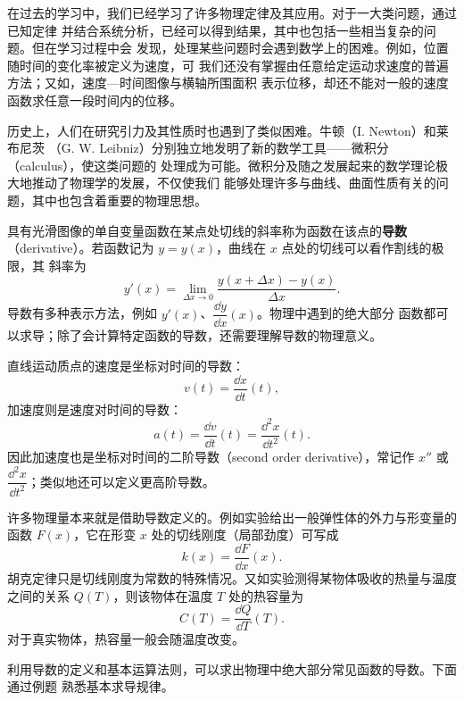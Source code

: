 在过去的学习中，我们已经学习了许多物理定律及其应用。对于一大类问题，通过已知定律
并结合系统分析，已经可以得到结果，其中也包括一些相当复杂的问题。但在学习过程中会
发现，处理某些问题时会遇到数学上的困难。例如，位置随时间的变化率被定义为速度，可
我们还没有掌握由任意给定运动求速度的普遍方法；又如，速度—时间图像与横轴所围面积
表示位移，却还不能对一般的速度函数求任意一段时间内的位移。

历史上，人们在研究引力及其性质时也遇到了类似困难。牛顿（I. Newton）和莱布尼茨
（G. W. Leibniz）分别独立地发明了新的数学工具——微积分（calculus），使这类问题的
处理成为可能。微积分及随之发展起来的数学理论极大地推动了物理学的发展，不仅使我们
能够处理许多与曲线、曲面性质有关的问题，其中也包含着重要的物理思想。

具有光滑图像的单自变量函数在某点处切线的斜率称为函数在该点的\textbf{导数}
（derivative）。若函数记为 $y=y(x)$，曲线在 $x$ 点处的切线可以看作割线的极限，其
斜率为
\begin{equation}
 y'(x)=\lim_{\Delta x\to0}\frac{y(x+\Delta x)-y(x)}{\Delta x}.
\end{equation}
导数有多种表示方法，例如 $y'(x)$、$\dfrac{\dd y}{\dd x}(x)$。物理中遇到的绝大部分
函数都可以求导；除了会计算特定函数的导数，还需要理解导数的物理意义。

直线运动质点的速度是坐标对时间的导数：
\begin{equation}
 v(t)=\frac{\dd x}{\dd t}(t),
\end{equation}
加速度则是速度对时间的导数：
\begin{equation}
 a(t)=\frac{\dd v}{\dd t}(t)=\frac{\dd^2x}{\dd t^2}(t).
\end{equation}
因此加速度也是坐标对时间的二阶导数（second order derivative），常记作 $x''$ 或
$\dfrac{\dd^2x}{\dd t^2}$；类似地还可以定义更高阶导数。

许多物理量本来就是借助导数定义的。例如实验给出一般弹性体的外力与形变量的函数
$F(x)$，它在形变 $x$ 处的切线刚度（局部劲度）可写成
\begin{equation}
 k(x)=\frac{\dd F}{\dd x}(x).
\end{equation}
胡克定律只是切线刚度为常数的特殊情况。又如实验测得某物体吸收的热量与温度之间的关系
$Q(T)$，则该物体在温度 $T$ 处的热容量为
\begin{equation}
 C(T)=\frac{\dd Q}{\dd T}(T).
\end{equation}
对于真实物体，热容量一般会随温度改变。

利用导数的定义和基本运算法则，可以求出物理中绝大部分常见函数的导数。下面通过例题
熟悉基本求导规律。


